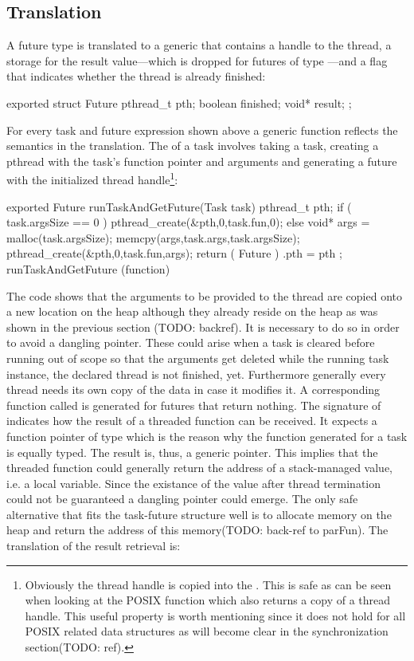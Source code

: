 \subsection{Translation}
A future type  is translated to a generic  that contains a handle to the thread, a storage for the result value---which is dropped for futures of type ---and a flag that indicates whether the thread is already finished:
\begin{ccode}
exported struct Future { 
  pthread_t pth; 
  boolean finished; 
  void* result; 
};
\end{ccode}

For every task and future expression shown above a generic function reflects the semantics in the translation. The  of a task involves taking a task, creating a pthread with the task's function pointer and arguments and generating a future with the initialized thread handle\footnote{Obviously the thread handle is copied into the . This is safe as can be seen when looking at the POSIX function  which also returns a copy of a thread handle. This useful property is worth mentioning since it does not hold for all POSIX related data structures as will become clear in the synchronization section(TODO: ref).}:
\begin{ccode}
exported Future runTaskAndGetFuture(Task task) { 
  pthread_t pth;
  if ( task.argsSize == 0 ) {
      pthread_create(&pth,0,task.fun,0);
  } else {
    void* args = malloc(task.argsSize);
    memcpy(args,task.args,task.argsSize);
    pthread_create(&pth,0,task.fun,args);
  }
  return ( Future ){ .pth = pth }; 
} runTaskAndGetFuture (function)
\end{ccode}
The code shows that the arguments to be provided to the thread are copied onto a new location on the heap although they already reside on the heap as was shown in the previous section (TODO: backref). It is necessary to do so in order to avoid a dangling pointer. These could arise when a task is cleared before running out of scope so that the arguments get deleted while the running task instance, the declared thread is not finished, yet. Furthermore generally every thread needs its own copy of the data in case it modifies it. A corresponding function called  is generated for futures that return nothing. The signature of  indicates how the result of a threaded function can be received. It expects a function pointer of type  which is the reason why the function generated for a task is equally typed. The result is, thus, a generic  pointer. This implies that the threaded function could generally return the address of a stack-managed value, i.e. a local variable. Since the existance of the value after thread termination could not be guaranteed a dangling pointer\cite{UnderstandingAndUsingCPointers} could emerge. The only safe alternative that fits the task-future structure well is to allocate memory on the heap and return the address of this memory(TODO: back-ref to parFun). The translation of the result retrieval is:

